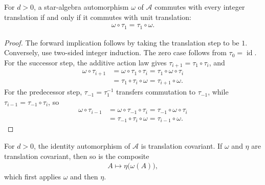 \begin{lemma}
    \label{thm:qca_translation_covariant_iff_commute_one}
    \leanok
    For $d>0$, a star-algebra automorphism $\omega$ of $\mathcal A$ commutes with
    every integer translation if and only if it commutes with unit translation:
    \begin{align}
        \omega\circ\tau_1=\tau_1\circ\omega.
    \end{align}
\end{lemma}

\begin{proof}\leanok
    The forward implication follows by taking the translation step to be $1$.
    Conversely, use two-sided integer induction.  The zero case follows from
    $\tau_0=\operatorname{id}$.  For the successor step, the additive action law
    gives $\tau_{i+1}=\tau_1\circ\tau_i$, and
    \begin{align}
        \omega\circ\tau_{i+1}
         & =\omega\circ\tau_1\circ\tau_i
        =\tau_1\circ\omega\circ\tau_i    \\
         & =\tau_1\circ\tau_i\circ\omega
        =\tau_{i+1}\circ\omega.
    \end{align}
    For the predecessor step, $\tau_{-1}=\tau_1^{-1}$ transfers commutation
    to $\tau_{-1}$, while $\tau_{i-1}=\tau_{-1}\circ\tau_i$, so
    \begin{align}
        \omega\circ\tau_{i-1}
         & =\omega\circ\tau_{-1}\circ\tau_i
        =\tau_{-1}\circ\omega\circ\tau_i    \\
         & =\tau_{-1}\circ\tau_i\circ\omega
        =\tau_{i-1}\circ\omega.
    \end{align}
\end{proof}

\begin{lemma}
    \label{thm:qca_translation_covariant_identity_composition}
    \leanok
    For $d>0$, the identity automorphism of $\mathcal A$ is translation
    covariant.  If $\omega$ and $\eta$ are translation covariant, then so is
    the composite
    \begin{align}
        A\longmapsto\eta\bigl(\omega(A)\bigr),
    \end{align}
    which first applies $\omega$ and then $\eta$.
\end{lemma}

